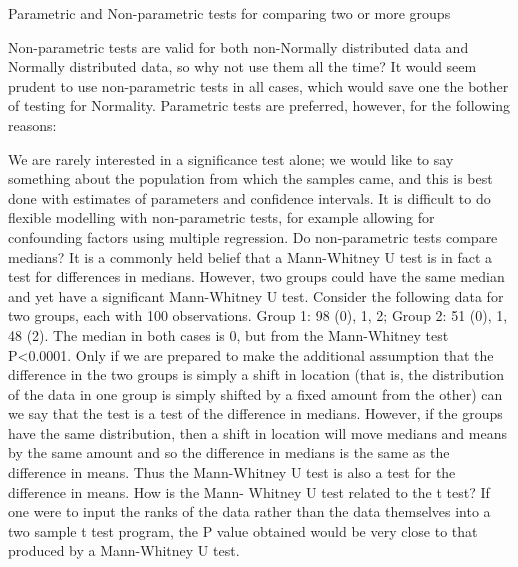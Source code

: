 Parametric and Non-parametric tests for comparing two or more groups


Non-parametric tests are valid for both non-Normally distributed data and Normally distributed data, so why not use them all the time? It would seem prudent to use non-parametric tests in all cases, which would save one the bother of testing for Normality. Parametric tests are preferred, however, for the following reasons:

We are rarely interested in a significance test alone; we would like to say something about the population from which the samples came, and this is best done with estimates of parameters and confidence intervals.
It is difficult to do flexible modelling with non-parametric tests, for example allowing for confounding factors using multiple regression.
Do non-parametric tests compare medians? It is a commonly held belief that a Mann-Whitney U test is in fact a test for differences in medians. However, two groups could have the same median and yet have a significant Mann-Whitney U test. Consider the following data for two groups, each with 100 observations. Group 1: 98 (0), 1, 2; Group 2: 51 (0), 1, 48 (2). The median in both cases is 0, but from the Mann-Whitney test P<0.0001. Only if we are prepared to make the additional assumption that the difference in the two groups is simply a shift in location (that is, the distribution of the data in one group is simply shifted by a fixed amount from the other) can we say that the test is a test of the difference in medians. However, if the groups have the same distribution, then a shift in location will move medians and means by the same amount and so the difference in medians is the same as the difference in means. Thus the Mann-Whitney U test is also a test for the difference in means. How is the Mann- Whitney U test related to the t test? If one were to input the ranks of the data rather than the data themselves into a two sample t test program, the P value obtained would be very close to that produced by a Mann-Whitney U test.
